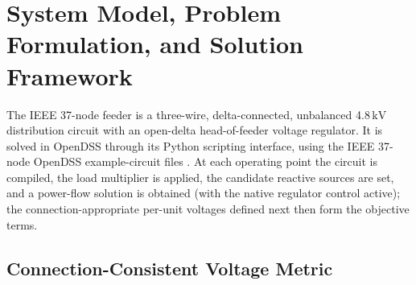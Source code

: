\documentclass{ieeeaccess}
\newcommand{\SI}[2]{#1\,\ensuremath{\mathrm{#2}}}
\begin{document}
\section{System Model, Problem Formulation, and Solution Framework}
\label{sec:model}
The IEEE 37-node feeder \cite{ieee37feeder} is a three-wire, delta-connected,
unbalanced \SI{4.8}{kV} distribution circuit with an open-delta head-of-feeder
voltage regulator. It is solved in OpenDSS
\cite{opendss,opendss_platform} through its Python scripting interface,
using the IEEE 37-node OpenDSS example-circuit files \cite{ieee37dss}. At each
operating point the circuit is compiled, the load multiplier is applied, the
candidate reactive sources are set, and a power-flow solution is obtained (with
the native regulator control active); the connection-appropriate per-unit
voltages defined next then form the objective terms.

\subsection{Connection-Consistent Voltage Metric}
\label{sec:connaware}
\end{document}
